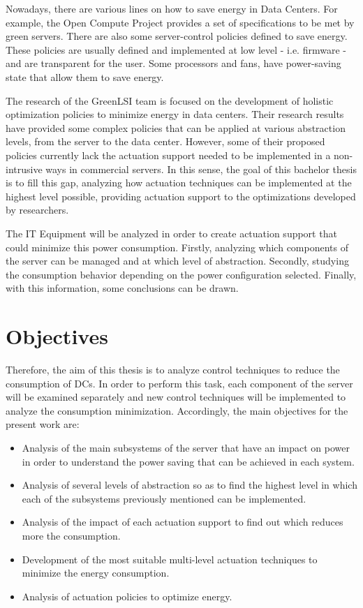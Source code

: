 Nowadays, there are various lines on how to save energy in Data Centers. For example, the Open Compute Project \cite{ocpHomepage} provides a set of specifications to be met by green servers. There are also some server-control policies defined to save energy. These policies are usually defined and implemented at low level - i.e. firmware - and are transparent for the user. Some processors and fans, have power-saving state that allow them to save energy.

The research of the GreenLSI team \cite{grenlsiHP} is focused on the development of holistic optimization policies  to minimize energy in data centers. Their research results have provided some complex policies that can be applied at various abstraction levels, from the server to the data center. However, some of their proposed policies currently lack the actuation support needed to be implemented in a non-intrusive ways in commercial servers. In this sense, the goal of this bachelor thesis is to fill this gap, analyzing how actuation techniques can be implemented at the highest level possible, providing actuation support to the optimizations developed by researchers.

The IT Equipment will be analyzed in order to create actuation support that could minimize this power consumption. Firstly, analyzing which components of the server can be managed and at which level of abstraction. Secondly, studying the consumption behavior depending on the power configuration selected. Finally, with this information, some conclusions can be drawn.

\section{Objectives}
Therefore, the aim of this thesis  is to analyze control techniques to reduce the consumption of DCs. In order to perform this task, each component of the server will be examined separately and new control techniques will be implemented to analyze the consumption minimization.
Accordingly, the main objectives for the present work are:
\begin{itemize}
    \item Analysis of the main subsystems of the server that have an impact on power in order to understand the power saving that can be achieved in each system.
    \item Analysis of several levels of abstraction so as to find the highest level in which each of the subsystems previously mentioned can be implemented.
    \item Analysis of the impact of each actuation support to find out which reduces more the consumption.
    \item Development of the most suitable multi-level actuation techniques to minimize the energy consumption.
    \item Analysis of actuation policies to optimize energy.
\end{itemize}

